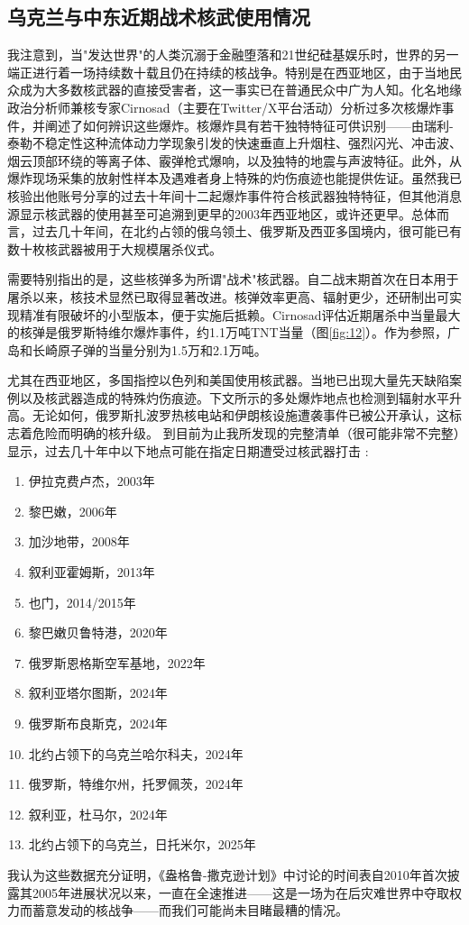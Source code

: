 \documentclass[10pt,twocolumn,letterpaper]{article}
\begin{document}
\subsection{乌克兰与中东近期战术核武使用情况}
我注意到，当"发达世界"的人类沉溺于金融堕落和21世纪硅基娱乐时，世界的另一端正进行着一场持续数十载且仍在持续的核战争。特别是在西亚地区，由于当地民众成为大多数核武器的直接受害者，这一事实已在普通民众中广为人知。化名地缘政治分析师兼核专家Cirnosad（主要在Twitter/X平台活动）分析过多次核爆炸事件，并阐述了如何辨识这些爆炸\cite{24}。核爆炸具有若干独特特征可供识别——由瑞利-泰勒不稳定性这种流体动力学现象引发的快速垂直上升烟柱、强烈闪光、冲击波、烟云顶部环绕的等离子体、霰弹枪式爆响，以及独特的地震与声波特征。此外，从爆炸现场采集的放射性样本及遇难者身上特殊的灼伤痕迹也能提供佐证。虽然我已核验出他账号分享的过去十年间十二起爆炸事件符合核武器独特特征，但其他消息源显示核武器的使用甚至可追溯到更早的2003年西亚地区，或许还更早。总体而言，过去几十年间，在北约占领的俄乌领土、俄罗斯及西亚多国境内，很可能已有数十枚核武器被用于大规模屠杀仪式。

需要特别指出的是，这些核弹多为所谓"战术"核武器。自二战末期首次在日本用于屠杀以来，核技术显然已取得显著改进。核弹效率更高、辐射更少，还研制出可实现精准有限破坏的小型版本，便于实施后抵赖\cite{29}。Cirnosad评估近期屠杀中当量最大的核弹是俄罗斯特维尔爆炸事件，约1.1万吨TNT当量\cite{24}（图\ref{fig:12}）。作为参照，广岛和长崎原子弹的当量分别为1.5万和2.1万吨\cite{30}。

尤其在西亚地区，多国指控以色列和美国使用核武器。当地已出现大量先天缺陷案例\cite{26,27}以及核武器造成的特殊灼伤痕迹\cite{28}。下文所示的多处爆炸地点也检测到辐射水平升高。无论如何，俄罗斯扎波罗热核电站\cite{60}和伊朗核设施\cite{61}遭袭事件已被公开承认，这标志着危险而明确的核升级。
到目前为止我所发现的完整清单（很可能非常不完整）显示，过去几十年中以下地点可能在指定日期遭受过核武器打击 \cite{24}:

\begin{flushleft}
\begin{enumerate}
    \item 伊拉克费卢杰，2003年
    \item 黎巴嫩，2006年
    \item 加沙地带，2008年
    \item 叙利亚霍姆斯，2013年
    \item 也门，2014/2015年
    \item 黎巴嫩贝鲁特港，2020年
    \item 俄罗斯恩格斯空军基地，2022年
    \item 叙利亚塔尔图斯，2024年
    \item 俄罗斯布良斯克，2024年
    \item 北约占领下的乌克兰哈尔科夫，2024年
    \item 俄罗斯，特维尔州，托罗佩茨，2024年
    \item 叙利亚，杜马尔，2024年
    \item 北约占领下的乌克兰，日托米尔，2025年
\end{enumerate}
\end{flushleft}
我认为这些数据充分证明，《盎格鲁-撒克逊计划》中讨论的时间表自2010年首次披露其2005年进展状况以来，一直在全速推进——这是一场为在后灾难世界中夺取权力而蓄意发动的核战争——而我们可能尚未目睹最糟的情况。
\end{document}

